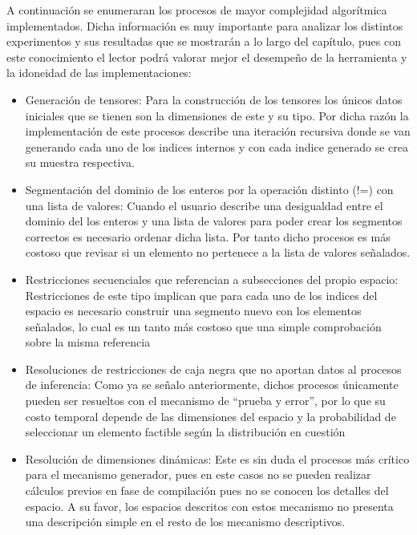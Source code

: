 A continuación se enumeraran los procesos de mayor complejidad algorítmica implementados.
Dicha información es muy importante para analizar los distintos experimentos y sus resultadas
que se mostrarán a lo largo del capítulo, pues con este conocimiento el lector podrá valorar
mejor el desempeño de la herramienta y la idoneidad de las implementaciones:
\begin{itemize}

      \item Generación de tensores: Para la construcción de los tensores los únicos datos iniciales
            que se tienen son la dimensiones de este y su tipo. Por dicha razón la implementación de este
            procesos describe una iteración recursiva donde se van generando cada uno de los indices internos
            y con cada indice generado se crea su muestra respectiva.
      \item Segmentación del dominio de los enteros por la operación distinto (!=) con una lista de valores: Cuando el usuario describe
            una desigualdad entre el dominio del los enteros y una lista de valores para poder crear los
            segmentos correctos es necesario ordenar dicha lista. Por tanto dicho procesos es más costoso que
            revisar si un elemento no pertenece a la lista de valores señalados.
      \item Restricciones secuenciales que referencian a subsecciones del propio espacio: Restricciones de
            este tipo implican que para cada uno de los indices del espacio es necesario construir una segmento nuevo
            con los elementos señalados, lo cual es un tanto más costoso que una simple comprobación sobre la misma
            referencia
      \item Resoluciones de restricciones de caja negra que no aportan datos al procesos de inferencia: Como ya
            se señalo anteriormente, dichos procesos únicamente pueden ser resueltos con el mecanismo de “prueba y error”,
            por lo que su costo temporal depende de las dimensiones del espacio y la probabilidad de seleccionar un elemento
            factible según la distribución en cuestión
      \item Resolución de dimensiones dinámicas: Este es sin duda el procesos más crítico para el mecanismo generador,
            pues en este casos no se pueden realizar cálculos previos en fase de compilación pues no se conocen los detalles
            del espacio. A su favor, los espacios descritos con estos mecanismo no presenta una descripción simple en el resto
            de los mecanismo descriptivos.
\end{itemize}

